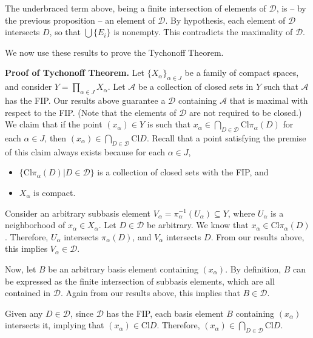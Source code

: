 \documentclass[12pt]{article}
\begin{document}
The underbraced term above, being a finite intersection of elements of $\mathcal{D}$, is -- by the previous proposition -- an element of $\mathcal{D}$. By hypothesis, each element of $\mathcal{D}$ intersects $D$, so that $\bigcup \{ E_i \}$ is nonempty. This contradicts the maximality of $\mathcal{D}$.

\vspace{1 \baselineskip}

We now use these results to prove the Tychonoff Theorem.

\textbf{Proof of Tychonoff Theorem. } Let $\{ X_\alpha \}_{\alpha \in J}$ be a family of compact spaces, and consider $Y = \prod_{\alpha \in J} X_\alpha$. Let $\mathcal{A}$ be a collection of closed sets in $Y$ such that $\mathcal{A}$ has the FIP. Our results above guarantee a $\mathcal{D}$ containing $\mathcal{A}$ that is maximal with respect to the FIP. (Note that the elements of $\mathcal{D}$ are not required to be closed.) We claim that if the point $(x_\alpha) \in Y$ is such that $x_\alpha \in \bigcap_{D \in \mathcal{D}} \text{Cl} \pi_\alpha (D)$ for each $\alpha \in J$, then $(x_\alpha) \in \bigcap_{D \in \mathcal{D}} \text{Cl} D$. Recall that a point satisfying the premise of this claim always exists because for each $\alpha \in J$,

\begin{itemize}
\item $\{ \text{Cl} \pi_\alpha (D) | D \in \mathbb{\mathcal{D}} \}$ is a collection of closed sets with the FIP, and
\item $X_\alpha$ is compact.
\end{itemize}

Consider an arbitrary subbasis element $V_\alpha = \pi_\alpha^{-1} (U_\alpha) \subseteq Y$, where $U_\alpha$ is a neighborhood of $x_\alpha \in X_\alpha$. Let $D \in \mathcal{D}$ be arbitrary. We know that $x_\alpha \in \text{Cl} \pi_\alpha (D)$. Therefore, $U_\alpha$ intersects $\pi_\alpha (D)$, and $V_\alpha$ intersects $D$. From our results above, this implies $V_\alpha \in \mathcal{D}$.

Now, let $B$ be an arbitrary basis element containing $(x_\alpha)$. By definition, $B$ can be expressed as the finite intersection of subbasis elements, which are all contained in $\mathcal{D}$. Again from our results above, this implies that $B \in \mathcal{D}$.

Given any $D \in \mathcal{D}$, since $\mathcal{D}$ has the FIP, each basis element $B$ containing $(x_\alpha)$ intersects it, implying that $(x_\alpha) \in \text{Cl} D$. Therefore, $(x_\alpha) \in \bigcap_{D \in \mathcal{D}} \text{Cl} D$.
\end{document}
